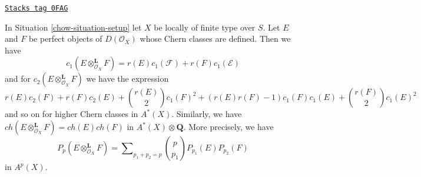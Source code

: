 \begin{lemma}
\label{chow-lemma-chern-classes-perfect-tensor-product}
\href{https://stacks.math.columbia.edu/tag/0FAG}{\texttt{Stacks tag 0FAG}}

In Situation \ref{chow-situation-setup} let $X$ be locally of finite type over $S$.
Let $E$ and $F$ be perfect objects of $D(\mathcal{O}_X)$ whose Chern classes
are defined. Then we have
$$
c_1(E \otimes_{\mathcal{O}_X}^\mathbf{L} F) =
r(E) c_1(\mathcal{F}) + r(F) c_1(\mathcal{E})
$$
and for $c_2(E \otimes_{\mathcal{O}_X}^\mathbf{L} F)$ we have the expression
$$
r(E) c_2(F) + r(F) c_2(E) + {r(E) \choose 2} c_1(F)^2 +
(r(E)r(F) - 1) c_1(F)c_1(E) + {r(F) \choose 2} c_1(E)^2
$$
and so on for higher Chern classes in $A^*(X)$. Similarly, we have
$ch(E \otimes_{\mathcal{O}_X}^\mathbf{L} F) = ch(E) ch(F)$
in $A^*(X) \otimes \mathbf{Q}$. More precisely, we have
$$
P_p(E \otimes_{\mathcal{O}_X}^\mathbf{L} F) = \sum\nolimits_{p_1 + p_2 = p}
{p \choose p_1} P_{p_1}(E) P_{p_2}(F)
$$
in $A^p(X)$.
\end{lemma}

